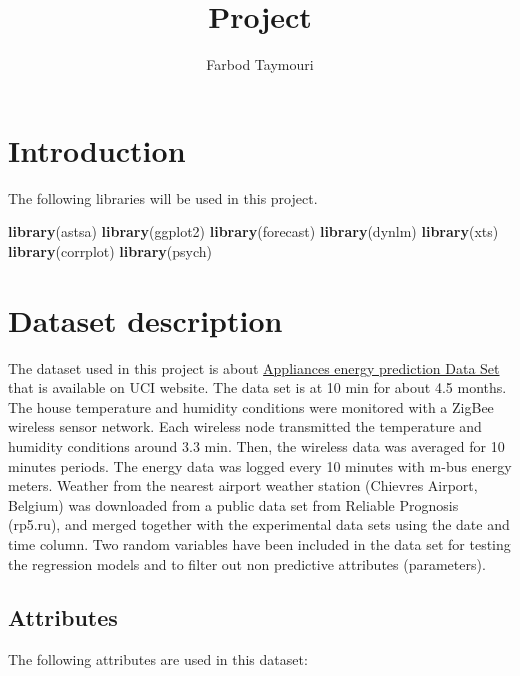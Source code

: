 \documentclass[]{article}
\title{Project}
\author{Farbod Taymouri}
\date{}
\newenvironment{Shaded}{\begin{snugshade}}{\end{snugshade}}
\newcommand{\KeywordTok}[1]{\textcolor[rgb]{0.13,0.29,0.53}{\textbf{#1}}}
\newcommand{\NormalTok}[1]{#1}
\begin{document}
\maketitle

\section{Introduction}\label{introduction}

The following libraries will be used in this project.

\begin{Shaded}
\begin{Highlighting}[]
\KeywordTok{library}\NormalTok{(astsa)}
\KeywordTok{library}\NormalTok{(ggplot2)}
\KeywordTok{library}\NormalTok{(forecast)}
\KeywordTok{library}\NormalTok{(dynlm)}
\KeywordTok{library}\NormalTok{(xts)}
\KeywordTok{library}\NormalTok{(corrplot)}
\KeywordTok{library}\NormalTok{(psych)}
\end{Highlighting}
\end{Shaded}

\section{Dataset description}\label{dataset-description}

The dataset used in this project is about
\href{https://archive.ics.uci.edu/ml/datasets/Appliances+energy+prediction}{Appliances
energy prediction Data Set} that is available on UCI website. The data
set is at 10 min for about 4.5 months. The house temperature and
humidity conditions were monitored with a ZigBee wireless sensor
network. Each wireless node transmitted the temperature and humidity
conditions around 3.3 min. Then, the wireless data was averaged for 10
minutes periods. The energy data was logged every 10 minutes with m-bus
energy meters. Weather from the nearest airport weather station
(Chievres Airport, Belgium) was downloaded from a public data set from
Reliable Prognosis (rp5.ru), and merged together with the experimental
data sets using the date and time column. Two random variables have been
included in the data set for testing the regression models and to filter
out non predictive attributes (parameters).

\subsection{Attributes}\label{attributes}

The following attributes are used in this dataset:
\end{document}
